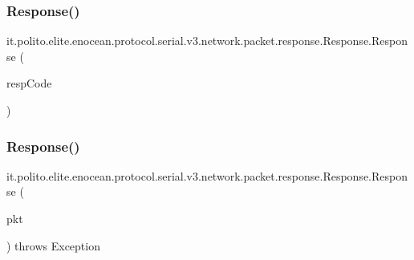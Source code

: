 \subsubsection{\texorpdfstring{Response()}{Response()}\hspace{0.1cm}{\footnotesize\ttfamily [1/3]}}
{\footnotesize\ttfamily it.\+polito.\+elite.\+enocean.\+protocol.\+serial.\+v3.\+network.\+packet.\+response.\+Response.\+Response (\begin{DoxyParamCaption}\item[{byte}]{resp\+Code }\end{DoxyParamCaption})}

\hypertarget{classit_1_1polito_1_1elite_1_1enocean_1_1protocol_1_1serial_1_1v3_1_1network_1_1packet_1_1response_1_1_response_a20b54888495cbb91f2b05aebdbbc5bd2}{}\label{classit_1_1polito_1_1elite_1_1enocean_1_1protocol_1_1serial_1_1v3_1_1network_1_1packet_1_1response_1_1_response_a20b54888495cbb91f2b05aebdbbc5bd2} 
\subsubsection{\texorpdfstring{Response()}{Response()}\hspace{0.1cm}{\footnotesize\ttfamily [2/3]}}
{\footnotesize\ttfamily it.\+polito.\+elite.\+enocean.\+protocol.\+serial.\+v3.\+network.\+packet.\+response.\+Response.\+Response (\begin{DoxyParamCaption}\item[{\hyperlink{classit_1_1polito_1_1elite_1_1enocean_1_1protocol_1_1serial_1_1v3_1_1network_1_1packet_1_1_e_s_p3_packet}{E\+S\+P3\+Packet}}]{pkt }\end{DoxyParamCaption}) throws Exception}

\hypertarget{classit_1_1polito_1_1elite_1_1enocean_1_1protocol_1_1serial_1_1v3_1_1network_1_1packet_1_1response_1_1_response_afa17d523c4740189ab5468ca8d72ee10}{}\label{classit_1_1polito_1_1elite_1_1enocean_1_1protocol_1_1serial_1_1v3_1_1network_1_1packet_1_1response_1_1_response_afa17d523c4740189ab5468ca8d72ee10} 
